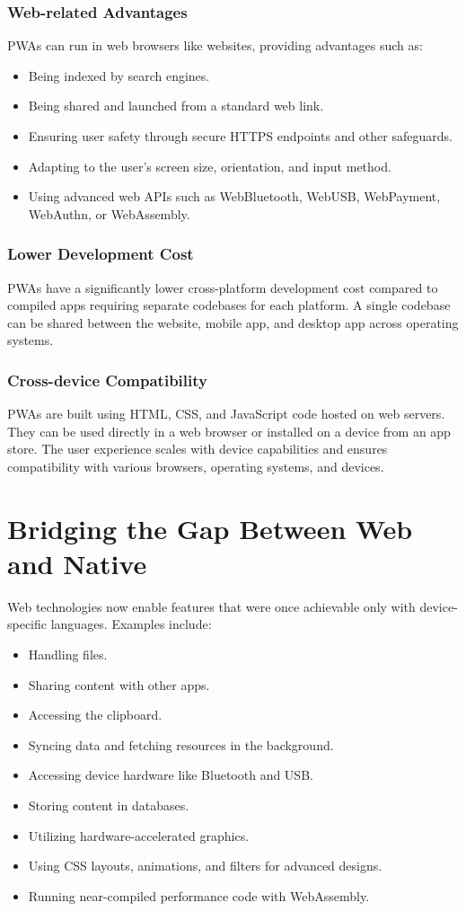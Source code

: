 \documentclass[conference]{IEEEtran}
\begin{document}
\subsubsection{Web-related Advantages}
PWAs can run in web browsers like websites, providing advantages such as:

\begin{itemize}
    \item Being indexed by search engines.
    \item Being shared and launched from a standard web link.
    \item Ensuring user safety through secure HTTPS endpoints and other safeguards.
    \item Adapting to the user's screen size, orientation, and input method.
    \item Using advanced web APIs such as WebBluetooth, WebUSB, WebPayment, WebAuthn, or WebAssembly.
\end{itemize}

\subsubsection{Lower Development Cost}
PWAs have a significantly lower cross-platform development cost compared to compiled apps requiring separate codebases for each platform. A single codebase can be shared between the website, mobile app, and desktop app across operating systems.

\subsubsection{Cross-device Compatibility}
PWAs are built using HTML, CSS, and JavaScript code hosted on web servers. They can be used directly in a web browser or installed on a device from an app store. The user experience scales with device capabilities and ensures compatibility with various browsers, operating systems, and devices.

\section{Bridging the Gap Between Web and Native}
Web technologies now enable features that were once achievable only with device-specific languages. Examples include:

\begin{itemize}
    \item Handling files.
    \item Sharing content with other apps.
    \item Accessing the clipboard.
    \item Syncing data and fetching resources in the background.
    \item Accessing device hardware like Bluetooth and USB.
    \item Storing content in databases.
    \item Utilizing hardware-accelerated graphics.
    \item Using CSS layouts, animations, and filters for advanced designs.
    \item Running near-compiled performance code with WebAssembly.
\end{itemize}
\end{document}

